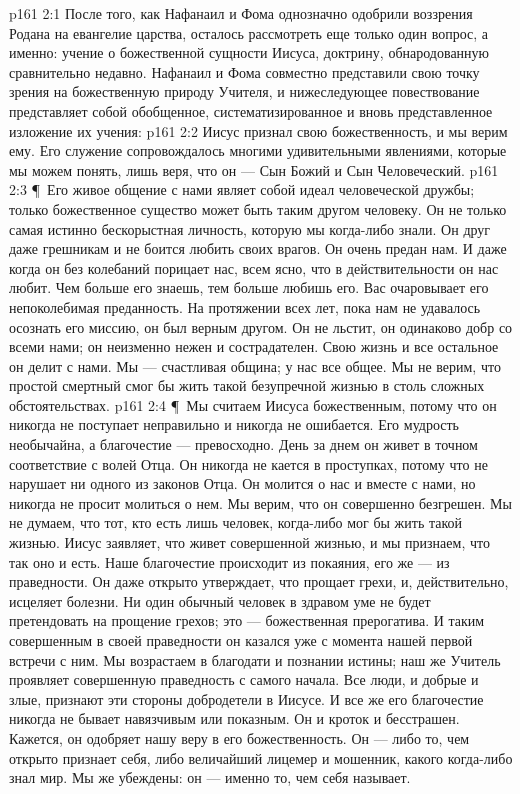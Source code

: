 \vs p161 2:1 После того, как Нафанаил и Фома однозначно одобрили воззрения Родана на евангелие царства, осталось рассмотреть еще только один вопрос, а именно: учение о божественной сущности Иисуса, доктрину, обнародованную сравнительно недавно. Нафанаил и Фома совместно представили свою точку зрения на божественную природу Учителя, и нижеследующее повествование представляет собой обобщенное, систематизированное и вновь представленное изложение их учения:
\vs p161 2:2 \bibnobreakspace Иисус признал свою божественность, и мы верим ему. Его служение сопровождалось многими удивительными явлениями, которые мы можем понять, лишь веря, что он --- Сын Божий и Сын Человеческий.
\vs p161 2:3 \P\ \bibnobreakspace Его живое общение с нами являет собой идеал человеческой дружбы; только божественное существо может быть таким другом человеку. Он не только самая истинно бескорыстная личность, которую мы когда\hyp{}либо знали. Он друг даже грешникам и не боится любить своих врагов. Он очень предан нам. И даже когда он без колебаний порицает нас, всем ясно, что в действительности он нас любит. Чем больше его знаешь, тем больше любишь его. Вас очаровывает его непоколебимая преданность. На протяжении всех лет, пока нам не удавалось осознать его миссию, он был верным другом. Он не льстит, он одинаково добр со всеми нами; он неизменно нежен и сострадателен. Свою жизнь и все остальное он делит с нами. Мы --- счастливая община; у нас все общее. Мы не верим, что простой смертный смог бы жить такой безупречной жизнью в столь сложных обстоятельствах.
\vs p161 2:4 \P\ \bibnobreakspace Мы считаем Иисуса божественным, потому что он никогда не поступает неправильно и никогда не ошибается. Его мудрость необычайна, а благочестие --- превосходно. День за днем он живет в точном соответствие с волей Отца. Он никогда не кается в проступках, потому что не нарушает ни одного из законов Отца. Он молится о нас и вместе с нами, но никогда не просит молиться о нем. Мы верим, что он совершенно безгрешен. Мы не думаем, что тот, кто есть лишь человек, когда\hyp{}либо мог бы жить такой жизнью. Иисус заявляет, что живет совершенной жизнью, и мы признаем, что так оно и есть. Наше благочестие происходит из покаяния, его же --- из праведности. Он даже открыто утверждает, что прощает грехи, и, действительно, исцеляет болезни. Ни один обычный человек в здравом уме не будет претендовать на прощение грехов; это --- божественная прерогатива. И таким совершенным в своей праведности он казался уже с момента нашей первой встречи с ним. Мы возрастаем в благодати и познании истины; наш же Учитель проявляет совершенную праведность с самого начала. Все люди, и добрые и злые, признают эти стороны добродетели в Иисусе. И все же его благочестие никогда не бывает навязчивым или показным. Он и кроток и бесстрашен. Кажется, он одобряет нашу веру в его божественность. Он --- либо то, чем открыто признает себя, либо величайший лицемер и мошенник, какого когда\hyp{}либо знал мир. Мы же убеждены: он --- именно то, чем себя называет.
